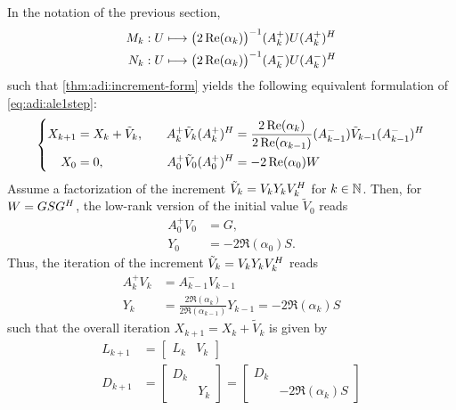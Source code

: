 In the notation of the previous section,
\begin{equation}
\label{eq:adi:ale:MN}
\begin{aligned}
  M_k &: U \longmapsto \big( 2\operatorname{Re}(\alpha_k) \big)^{-1} (A_k^+) U (A_k^+)^H \\
  N_k &: U \longmapsto \big( 2\operatorname{Re}(\alpha_k) \big)^{-1} (A_k^-) U (A_k^-)^H
\end{aligned}
\end{equation}
such that \autoref{thm:adi:increment-form} yields the following equivalent formulation of \eqref{eq:adi:ale1step}:
\begin{equation}
\left\{
\begin{aligned}
  X_{k+1}
    &= X_k + \tilde V_k, &
  \quad %
  A_k^+ \tilde V_k (A_k^+)^\HT
    &= \frac{2\Re(\alpha_k)}{2\Re(\alpha_{k-1})}
      (A_{k-1}^-) \tilde V_{k-1} (A_{k-1}^-)^\HT \\
  X_0
    &= 0, &
  A_0^+ \tilde V_0 (A_0^+)^\HT
    &= -2\Re(\alpha_0) W
\end{aligned}
\right.
\end{equation}
Assume a factorization of the increment $\tilde V_k = V_k Y_k V_k^H$ for $k\in\mathbb{N}$.
Then, for $W = GSG^H$,
the low-rank version of the initial value $\tilde V_0$ reads
\begin{equation}
\begin{aligned}
  A_0^+ V_0 &= G, \\
  Y_0 &= -2\Re(\alpha_0) S.
\end{aligned}
\end{equation}
Thus,
the iteration of the increment $\tilde V_{k} = V_k Y_k V_k^H$ reads
\begin{equation}
\begin{aligned}
  A_k^+ V_k &= A_{k-1}^- V_{k-1} \\
  Y_k &= \frac{2\Re(\alpha_k)}{2\Re(\alpha_{k-1})} Y_{k-1}
  = -2\Re(\alpha_k) S
\end{aligned}
\end{equation}
such that the overall iteration $X_{k+1} = X_k + \tilde V_k$ is given by
\begin{equation}
\begin{aligned}
  L_{k+1} &= \begin{bmatrix}
    L_k &
    V_k
  \end{bmatrix} \\
    D_{k+1} &= \begin{bmatrix}
      D_k \\
      & Y_k
    \end{bmatrix}
    = \begin{bmatrix}
      D_k \\
      & -2\Re(\alpha_k) S
    \end{bmatrix}
\end{aligned}
\end{equation}
